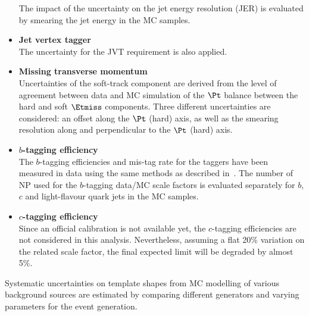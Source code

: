 \begin{itemize}
	The impact of the uncertainty on the jet energy resolution (JER) is
	evaluated by smearing the jet energy in the MC samples. 
	\item \textbf{Jet vertex tagger} \\ 
	The uncertainty for the JVT requirement is also applied. 	
	\item \textbf{Missing transverse momentum} \\ 
	Uncertainties of the soft-track component are derived from the level
	of agreement between data and MC simulation of the $\Pt$ balance
	between the hard and soft $\Etmiss$ components. Three different
	uncertainties are considered: an offset along the $\Pt$ (hard) axis,
	as well as the smearing resolution along and perpendicular to the
	$\Pt$ (hard) axis.
	\item \textbf{$b$-tagging efficiency} \\ 
	The $b$-tagging efficiencies and mis-tag rate for the taggers have
	been measured in data using the same methods as described
	in~\cite{ATLAS-CONF-2014-046,ATLAS-CONF-2014-004}. The number of NP
	used for the $b$-tagging data/MC scale factors is evaluated
	separately for $b$, $c$ and light-flavour quark jets in the MC
	samples.
	\item \textbf{$c$-tagging efficiency} \\
	Since an official calibration is not available yet, the $c$-tagging
	efficiencies are not considered in this analysis. Nevertheless,
	assuming a flat 20\% variation on the related scale factor, 
	the final expected limit will be degraded by almost 5\%.	
\end{itemize}

\newpage
\noindent Systematic uncertainties on template shapes from MC modelling of various background sources are 
estimated by comparing different generators and varying parameters for the event generation.

